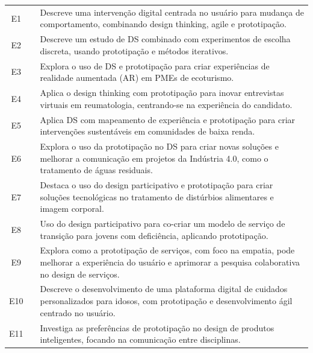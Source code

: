 \begin{table}[h!]
	\centering
	\label{tab:estudos}
	\begin{tabular}{|c|m{4cm}|m{10cm}|}
		\hline
		\makecell{\textbf{ID}} & \makecell{\textbf{Autor, Referência}} & \makecell{\textbf{Descrição}} \\ \hline
		E1 & \cite{asbjornsen2022echange} & Descreve uma intervenção digital centrada no usuário para mudança de comportamento, combinando design thinking, agile e prototipação. \\ \hline
		E2 & \cite{dehmel2021weather} & Descreve um estudo de DS combinado com experimentos de escolha discreta, usando prototipação e métodos iterativos. \\ \hline
		E3 & \cite{giraldo2024ecotourism} & Explora o uso de DS e prototipação para criar experiências de realidade aumentada (AR) em PMEs de ecoturismo. \\ \hline
		E4 & \cite{kumar2023rheumatology} & Aplica o design thinking com prototipação para inovar entrevistas virtuais em reumatologia, centrando-se na experiência do candidato. \\ \hline
		E5 & \cite{lambe2022capabilities} & Aplica DS com mapeamento de experiência e prototipação para criar intervenções sustentáveis em comunidades de baixa renda. \\ \hline
		E6 & \cite{lee2023industry} & Explora o uso da prototipação no DS para criar novas soluções e melhorar a comunicação em projetos da Indústria 4.0, como o tratamento de águas residuais. \\ \hline
		E7 & \cite{milton2021eatingdisorders} & Destaca o uso do design participativo e prototipação para criar soluções tecnológicas no tratamento de distúrbios alimentares e imagem corporal. \\ \hline
		E8 & \cite{seko2024transitions} & Uso do design participativo para co-criar um modelo de serviço de transição para jovens com deficiência, aplicando prototipação. \\ \hline
		E9 & \cite{soto2023prototyping} & Explora como a prototipação de serviços, com foco na empatia, pode melhorar a experiência do usuário e aprimorar a pesquisa colaborativa no design de serviços. \\ \hline
		E10 & \cite{villa2022integratedcare} & Descreve o desenvolvimento de uma plataforma digital de cuidados personalizados para idosos, com prototipação e desenvolvimento ágil centrado no usuário. \\ \hline
		E11 & \cite{wang2023smartproducts} & Investiga as preferências de prototipação no design de produtos inteligentes, focando na comunicação entre disciplinas. \\ \hline

\end{tabular}
\end{table}
